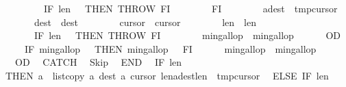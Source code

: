 \begin{isabellebody}
\ \ \ \ \ \ \ \ \ \ IF\ {\isasymacute}len{}\ {\isacharequal}\ {}\ THEN\ THROW\ FI\isanewline
\ \ \ \ \ \ \ \ FI{\isacharsemicolon}{\isacharsemicolon}\isanewline
\ \ \ \ \ \ \ \ {\isasymacute}a{\isacharbang}{\isasymacute}dest\ {\isacharcolon}{\isacharequal}{\isacharequal}\ {\isasymacute}tmp{\isacharbang}{\isasymacute}cursor{}{\isacharsemicolon}{\isacharsemicolon}\isanewline
\ \ \ \ \ \ \ \ {\isasymacute}dest\ {\isacharcolon}{\isacharequal}{\isacharequal}\ {\isasymacute}dest{\isacharplus}{}{\isacharsemicolon}{\isacharsemicolon}\isanewline
\ \ \ \ \ \ \ \ {\isasymacute}cursor{}\ {\isacharcolon}{\isacharequal}{\isacharequal}\ {\isasymacute}cursor{}{\isacharplus}{}{\isacharsemicolon}{\isacharsemicolon}\isanewline
\ \ \ \ \ \ \ \ {\isasymacute}len{}\ {\isacharcolon}{\isacharequal}{\isacharequal}\ {\isasymacute}len{}{\isacharminus}{}{\isacharsemicolon}{\isacharsemicolon}\isanewline
\ \ \ \ \ \ \ \ IF\ {\isasymacute}len{}\ {\isacharequal}\ {}\ THEN\ THROW\ FI{\isacharsemicolon}{\isacharsemicolon}\isanewline
\ \ \ \ \ \ \ \ {\isasymacute}min{\isacharunderscore}gallop\ {\isacharcolon}{\isacharequal}{\isacharequal}\ {\isasymacute}min{\isacharunderscore}gallop{\isacharminus}{}\isanewline
\ \ \ \ \ \ OD{\isacharsemicolon}{\isacharsemicolon}\isanewline
\ \ \ \ \ \ IF\ {\isasymacute}min{\isacharunderscore}gallop\ {\isacharless}\ {}\ THEN\ {\isasymacute}min{\isacharunderscore}gallop\ {\isacharcolon}{\isacharequal}{\isacharequal}\ {}\ FI{\isacharsemicolon}{\isacharsemicolon}\isanewline
\ \ \ \ \ \ {\isasymacute}min{\isacharunderscore}gallop\ {\isacharcolon}{\isacharequal}{\isacharequal}\ {\isasymacute}min{\isacharunderscore}gallop\ {\isacharplus}\ {}\isanewline
\ \ \ \ OD\isanewline
\ \ CATCH\isanewline
\ \ Skip\isanewline
\ \ END{\isacharsemicolon}{\isacharsemicolon}\isanewline
\ \ IF\ {\isasymacute}len{}\ {\isacharequal}\ {}\isanewline
\ \ THEN\ {\isasymacute}a\ {\isacharcolon}{\isacharequal}{\isacharequal}\ list{\isacharunderscore}copy\ {\isasymacute}a\ {\isasymacute}dest\ {\isasymacute}a\ {\isasymacute}cursor{}\ {\isasymacute}len{}{\isacharsemicolon}{\isacharsemicolon}{\isasymacute}a{\isacharbang}{\isacharparenleft}{\isasymacute}dest{\isacharplus}{\isasymacute}len{}{\isacharparenright}\ {\isacharcolon}{\isacharequal}{\isacharequal}\ {\isasymacute}tmp{\isacharbang}{\isasymacute}cursor{}\isanewline
\ \ ELSE\ IF\ {\isasymacute}len{}\ {\isacharequal}\ {}\isanewline

\end{isabellebody}
